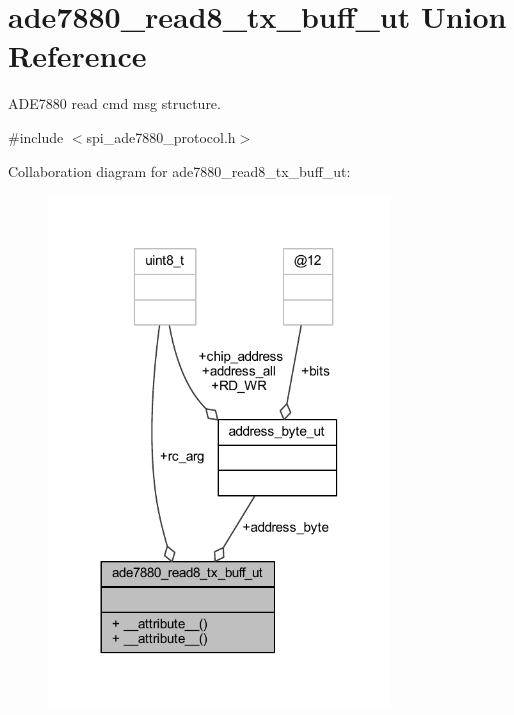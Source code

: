 \hypertarget{a00015}{\section{ade7880\-\_\-read8\-\_\-tx\-\_\-buff\-\_\-ut Union Reference}
\label{dd/d1b/a00015}
}


A\-D\-E7880 read cmd msg structure.  




{\ttfamily \#include $<$spi\-\_\-ade7880\-\_\-protocol.\-h$>$}



Collaboration diagram for ade7880\-\_\-read8\-\_\-tx\-\_\-buff\-\_\-ut\-:\nopagebreak
\begin{figure}[H]
\begin{center}
\leavevmode
\includegraphics[width=257pt]{dc/ddf/a00067}
\end{center}
\end{figure}

